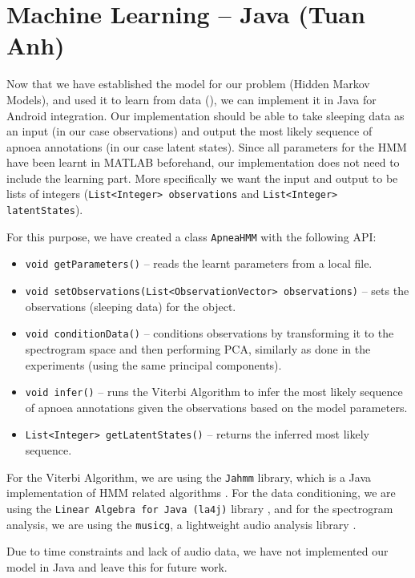 \section{Machine Learning -- Java (Tuan Anh)}
\label{sec:mljava}

Now that we have established the model for our problem (Hidden Markov Models), and used it to learn from data (), we can implement it in Java for Android integration. Our implementation should be able to take sleeping data as an input (in our case observations) and output the most likely sequence of apnoea annotations (in our case latent states). Since all parameters for the HMM have been learnt in MATLAB beforehand, our implementation does not need to include the learning part. More specifically we want the input and output to be lists of integers (\verb!List<Integer> observations! and \verb!List<Integer> latentStates!).

For this purpose, we have created a class \verb!ApneaHMM! with the following API:
\begin{itemize}
	\item \verb!void getParameters()! -- reads the learnt parameters from a local file.
	\item \verb!void setObservations(List<ObservationVector> observations)! -- sets the observations (sleeping data) for the object.
	\item \verb!void conditionData()! -- conditions observations by transforming it to the spectrogram space and then performing PCA, similarly as done in the experiments (using the same principal components).
	\item \verb!void infer()! -- runs the Viterbi Algorithm to infer the most likely sequence of apnoea annotations given the observations based on the model parameters.
	\item \verb!List<Integer> getLatentStates()! -- returns the inferred most likely sequence.
\end{itemize}

For the Viterbi Algorithm, we are using the \verb!Jahmm! library, which is a Java implementation of HMM related algorithms \cite{jahmm}. For the data conditioning, we are using the \verb!Linear Algebra for Java (la4j)! library \cite{la4j}, and for the spectrogram analysis, we are using the \verb!musicg!, a lightweight audio analysis library \cite{musicg}.

Due to time constraints and lack of audio data, we have not implemented our model in Java and leave this for future work.